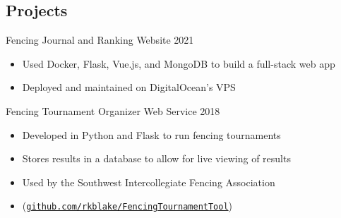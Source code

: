 \documentclass[line,margin]{res}
\begin{document}
\begin{resume}
\vspace{-4pt}
\section{Projects}
\vspace{12pt}

Fencing Journal and Ranking Website
\hfill 2021
	\begin{itemize} \itemsep -2pt
		\item Used Docker, Flask, Vue.js, and MongoDB to build a full-stack web app
		\item Deployed and maintained on DigitalOcean's VPS
	\end{itemize}

\vspace{-8pt}
Fencing Tournament Organizer Web Service
\hfill 2018
	\begin{itemize} \itemsep -2pt
		\item Developed in Python and Flask to run fencing tournaments
		\item Stores results in a database to allow for live viewing of results
		\item Used by the Southwest Intercollegiate Fencing Association
		\item (\href{https://github.com/rkblake/FencingTournamentTool}{\texttt{github.com/rkblake/FencingTournamentTool}})
	\end{itemize}



\end{resume}
\end{document}
